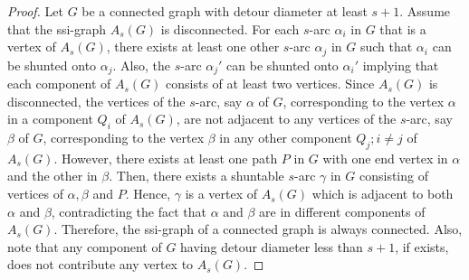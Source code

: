 \documentclass[12pt,a4paper,twoside]{article}
\theoremstyle{casesty}
\theoremstyle{subcasesty}
\theoremstyle{schemesty}
\begin{document}
\begin{proof}
	Let $G$ be a connected graph with detour diameter at least $s+1$. Assume that the ssi-graph $A_{s}(G)$ is disconnected. For each $s$-arc $\alpha_{i}$ in $G$ that is a vertex of $A_{s}(G)$, there exists at least one other $s$-arc $\alpha_{j}$ in $G$ such that $\alpha_{i}$ can be shunted onto $\alpha_{j}$. Also, the $s$-arc $\alpha_{j}'$ can be shunted onto $\alpha_{i}'$ implying that each component of $A_{s}(G)$ consists of at least two vertices. Since $A_{s}(G)$ is disconnected, the vertices of the $s$-arc, say $\alpha$ of $G$, corresponding to the vertex $\alpha$ in a component $Q_{i}$ of $A_{s}(G)$, are not adjacent to any vertices of the $s$-arc, say $\beta$ of $G$, corresponding to the vertex $\beta$ in any other component $Q_{j};i\ne j$ of $A_{s}(G)$. However, there exists at least one path $P$ in $G$ with one end vertex in $\alpha$ and the other in $\beta$. Then, there exists a shuntable $s$-arc $\gamma$ in $G$ consisting of vertices of $\alpha,\beta$ and $P$. Hence, $\gamma$ is a vertex of $A_{s}(G)$ which is adjacent to both $\alpha$ and $\beta$, contradicting the fact that $\alpha$ and $\beta$ are in different components of $A_{s}(G)$. Therefore, the ssi-graph of a connected graph is always connected. Also, note that any component of $G$ having detour diameter less than $s+1$, if exists, does not contribute any vertex to $A_{s}(G)$. %
	

\end{proof}
\end{document}
